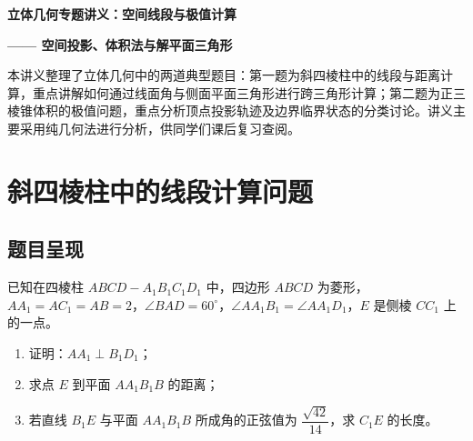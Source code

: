 \documentclass[11pt,a4paper]{ctexart}
\begin{document}
\begin{center}
    \LARGE \textbf{立体几何专题讲义：空间线段与极值计算}
\end{center}

\vspace{0.2cm}
\begin{center}
    \large \textbf{—— 空间投影、体积法与解平面三角形}
\end{center}
\vspace{0.5cm}

本讲义整理了立体几何中的两道典型题目：第一题为斜四棱柱中的线段与距离计算，重点讲解如何通过线面角与侧面平面三角形进行跨三角形计算；第二题为正三棱锥体积的极值问题，重点分析顶点投影轨迹及边界临界状态的分类讨论。讲义主要采用纯几何法进行分析，供同学们课后复习查阅。

\vspace{0.2cm}
\par
\vspace{0.5cm}

\section{斜四棱柱中的线段计算问题}

\subsection{题目呈现}
已知在四棱柱 $ABCD-A_1B_1C_1D_1$ 中，四边形 $ABCD$ 为菱形，$AA_1 = AC_1 = AB = 2$，$\angle BAD = 60^\circ$，$\angle AA_1B_1 = \angle AA_1D_1$，$E$ 是侧棱 $CC_1$ 上的一点。
\begin{enumerate}
    \item 证明：$AA_1 \perp B_1D_1$；
    \item 求点 $E$ 到平面 $AA_1B_1B$ 的距离；
    \item 若直线 $B_1E$ 与平面 $AA_1B_1B$ 所成角的正弦值为 $\dfrac{\sqrt{42}}{14}$，求 $C_1E$ 的长度。
\end{enumerate}
\end{document}
